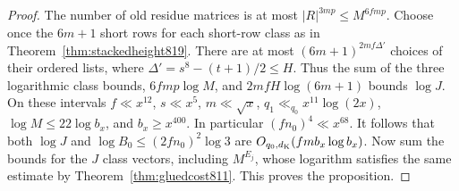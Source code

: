 \documentclass[a4paper,11pt]{article}
\theoremstyle{definition}
\theoremstyle{remark}
\numberwithin{equation}{section}
\begin{document}
\begin{proof}
The number of old residue matrices is at most
\(|R|^{3mp}\le M^{6fmp}\).
Choose once the \(6m+1\) short rows for each short-row class
as in Theorem~\ref{thm:stackedheight819}. There are at most
\((6m+1)^{2mf\Delta'}\) choices of their ordered lists,
where \(\Delta'=s^8-(t+1)/2\le H\). Thus the sum of the
three logarithmic class bounds, \(6fmp\log M\), and
\(2mfH\log(6m+1)\) bounds \(\log J\).
On these intervals \(f\ll x^{12}\), \(s\ll x^5\),
\(m\ll\sqrt x\), \(q_1\ll_{q_0}x^{11}\log(2x)\),
\(\log M\le22\log b_x\), and \(b_x\ge x^{400}\).
In particular \((fn_0)^4\ll x^{68}\).
It follows that both \(\log J\) and
\(\log B_0\le(2fn_0)^2\log3\) are \(O_{q_0,d_{\rm K}}(fmb_x\log b_x)\).
Now sum the bounds for the \(J\) class vectors, including
\(M^{E_j}\), whose logarithm satisfies the same estimate by
Theorem~\ref{thm:gluedcost811}. This proves the proposition.
\end{proof}
\end{document}
